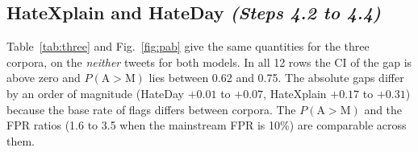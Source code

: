 \documentclass[runningheads,a4paper,oribibl]{llncs}
\begin{document}
\begin{table}[H]
\centering\small\setlength{\tabcolsep}{3pt}
\caption{gap on \emph{neither} tweets (95\% CI), label-standardised gap on all not-hate
tweets, and $P(\mathrm{A}{>}\mathrm{M})$ on \emph{neither} tweets.\label{tab:groupdefs}}
\end{table}

\subsection{HateXplain and HateDay \emph{(Steps 4.2 to 4.4)}}\label{sec:three}
Table~\ref{tab:three} and Fig.~\ref{fig:pab} give the same quantities for the three corpora,
on the \emph{neither} tweets for both models. In all 12 rows the CI of the gap is above zero
and $P(\mathrm{A}{>}\mathrm{M})$ lies between 0.62 and 0.75. The absolute gaps differ by an
order of magnitude (HateDay $+0.01$ to $+0.07$, HateXplain $+0.17$ to $+0.31$) because the base
rate of flags differs between corpora. The $P(\mathrm{A}{>}\mathrm{M})$ and the FPR ratios 
(1.6 to 3.5 when the mainstream FPR is 10\%) are comparable across them.
\end{document}
